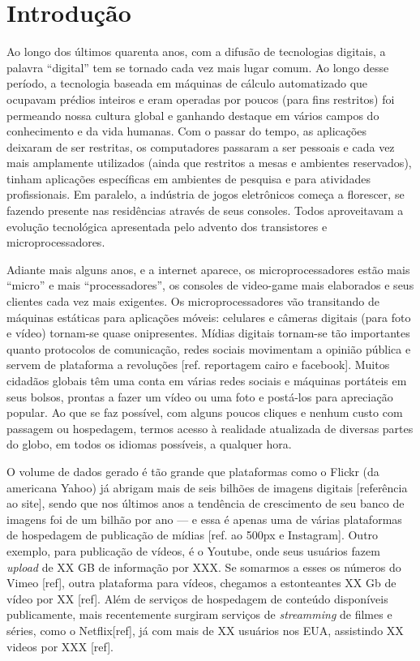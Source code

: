 \chapter{Introdução}


	Ao longo dos últimos quarenta anos, com a difusão de tecnologias digitais, a palavra ``digital'' tem se tornado cada vez mais lugar comum. Ao longo desse período, a tecnologia baseada em máquinas de cálculo automatizado que ocupavam prédios inteiros e eram operadas por poucos (para fins restritos) foi permeando nossa cultura global e ganhando destaque em vários campos do conhecimento e da vida humanas. Com o passar do tempo, as aplicações deixaram de ser restritas, os computadores passaram a ser pessoais e cada vez mais amplamente utilizados (ainda que restritos a mesas e ambientes reservados), tinham aplicações específicas em ambientes de pesquisa e para atividades profissionais. Em paralelo, a indústria de jogos eletrônicos começa a florescer, se fazendo presente nas residências através de seus consoles. Todos aproveitavam a evolução tecnológica apresentada pelo advento dos transistores e microprocessadores.

	Adiante mais alguns anos, e a internet aparece, os microprocessadores estão mais ``micro'' e mais ``processadores'', os consoles de video-game mais elaborados e seus clientes cada vez mais exigentes. Os microprocessadores vão transitando de máquinas estáticas para aplicações móveis: celulares e câmeras digitais (para foto e vídeo) tornam-se quase onipresentes. Mídias digitais tornam-se tão importantes quanto protocolos de comunicação, redes sociais movimentam a opinião pública e servem de plataforma a revoluções [ref. reportagem cairo e facebook]. Muitos cidadãos globais têm uma conta em várias redes sociais e máquinas portáteis em seus bolsos, prontas a fazer um vídeo ou uma foto e postá-los para apreciação popular. Ao que se faz possível, com alguns poucos cliques e nenhum custo com passagem ou hospedagem, termos acesso à realidade atualizada de diversas partes do globo, em todos os idiomas possíveis, a qualquer hora.

	O volume de dados gerado é tão grande que plataformas como o Flickr (da americana Yahoo) já abrigam mais de seis bilhões de imagens digitais [referência ao site], sendo que nos últimos anos a tendência de crescimento de seu banco de imagens foi de um bilhão por ano --- e essa é apenas uma de várias plataformas de hospedagem de publicação de mídias [ref. ao 500px e Instagram]. Outro exemplo, para publicação de vídeos, é o Youtube, onde seus usuários fazem {\em upload} de XX GB de informação por XXX. Se somarmos a esses os números do Vimeo [ref], outra plataforma para vídeos, chegamos a estonteantes XX Gb de vídeo por XX [ref]. Além de serviços de hospedagem de conteúdo disponíveis publicamente, mais recentemente surgiram serviços de {\em streamming} de filmes e séries, como o Netflix[ref], já com mais de XX usuários nos EUA, assistindo XX videos por XXX [ref].


